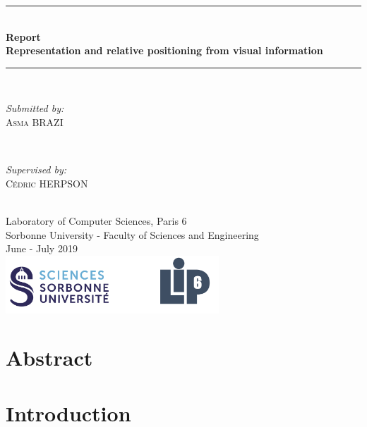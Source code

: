 \documentclass[12pt]{report}
\begin{document}
\begin{titlepage}
	
	\newcommand{\HRule}{\rule{\linewidth}{0.5mm}} %
	
	\center 
	\HRule \\[0.4cm]
	{ \huge \bfseries Report \\Representation and relative positioning from visual information}\\[0.4cm]
	\HRule \\[1.5cm]
	
	\begin{minipage}{0.4\textwidth}
		\begin{flushleft} \large
			\emph{Submitted by:}\\
			\textsc{Asma BRAZI}
		\end{flushleft}
	\end{minipage}
	~
	\begin{minipage}{0.4\textwidth}
		\begin{flushright} \large
			\emph{Supervised by:} \\
			\textsc{Cédric HERPSON}\\
		\end{flushright}
	\end{minipage}\\[4cm]
	
	
	{\large Laboratory of Computer Sciences, Paris 6 \\ Sorbonne University - Faculty of Sciences and Engineering}\\[3cm] 
	{\large June - July 2019 }\\[3cm] 
	\includegraphics[width=0.6\textwidth]{res/logo.png}\\[1cm] 
	\vfill %
	
\end{titlepage}
\tableofcontents
\chapter{Abstract}
\chapter{Introduction}
\end{document}
